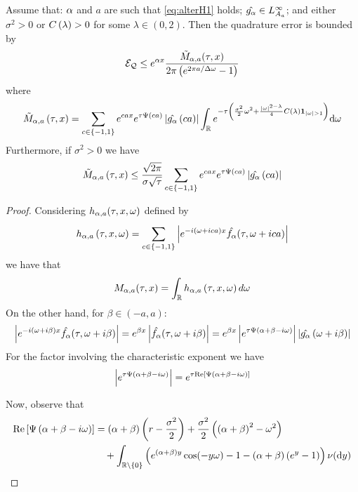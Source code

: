 \documentclass[11pt]{amsart}
\begin{document}
\begin{theorem} \label{teo:boundM}
Assume that: $\alpha$ and $a$ are such that \eqref{eq:alterH1} holds; $\hat{g_{\alpha}} \in L^\infty_{A_{a}}$; and either $\sigma^2>0$ or $C \left( {\lambda} \right)>0$ for some $\lambda\in (0,2)$.
Then the quadrature error is bounded by
\begin{equation*}
\mathcal{E_Q} \leq e^{\alpha x} \frac{\tilde{M}_{\alpha,a}(\tau,x) }{2\pi\left( {e^{2\pi a/\Delta\omega}-1} \right)}
\end{equation*}
where 
\begin{equation}\label{eq:Mbound}
\tilde{M}_{\damp,a} \parent{\tau,x} 
=
\ssum{c\in \sset{-1,1}}{} 
\expfs{cax}
\expfs{\tau \Psi \parent{ca}} \absval{\ft{\ga} \parent{ca}}
\int_{\R}  \expfs{-\tau \left( \frac{\sigma^2}{2}\omega^2 + \frac{|\omega|^{2 - \lambda}}{4} \cl\indicator_{\absval{\omega}>1}\right) } \d \omega
\end{equation}
Furthermore, if $\sigma^2>0$ we have
\begin{equation}
\label{eq:Mboundsigpositive}
\tilde{M}_{\alpha,a} \left( {\tau,x} \right)  \leq \frac{\sqrt{2\pi}}{\sigma\sqrt{\tau}}\displaystyle\sum\limits_{c\in \left\lbrace {-1,1} \right\rbrace}^{} 
e^{cax}
e^{\tau \Psi \left( {ca} \right)} \left| {\hat{g_{\alpha}} \left( {ca} \right)} \right|
\end{equation}

\begin{proof}
Considering $h_{\alpha,a}(\tau,x,\omega)$ defined by
\begin{equation}
h_{\alpha,a} \left( {\tau,x,\omega} \right) = \displaystyle\sum\limits_{c \in \left\lbrace {-1,1} \right\rbrace}^{} \left| {e^{-i\left( {\omega + ica} \right) x}\hat{f_{\alpha}}(\tau,\omega+i ca)} \right| 
\end{equation}
we have that
$$M_{\alpha,a}(\tau,x) = \int_{\mathbb{R}}h_{\alpha,a} \left( {\tau,x,\omega} \right) d\omega$$
On the other hand, for  $\beta\in (-a,a)$:
\begin{equation}
\left| {e^{-i\left( {\omega + i\beta} \right) x}\hat{f_{\alpha}}(\tau,\omega+i \beta)} \right| = e^{\beta x} \left| {\hat{f_{\alpha}}(\tau,\omega+i \beta)} \right|=e^{\beta x}\left| {e^{\tau \Psi \left( {{\alpha+\beta-i\omega}} \right)}} \right|\left| { \hat{g_{\alpha}}\left( {\omega+i\beta} \right)} \right|
\end{equation}
For the factor involving the characteristic exponent we have
\begin{equation}
\left| {e^{\tau \Psi \left( {{\alpha+\beta-i\omega}} \right)}} \right|=e^{\tau \mathrm{Re}\left[\Psi \left( {{\alpha+\beta-i\omega}} \right)\right]}
\end{equation}

Now, observe that
\begin{align}
\notag \mathrm{Re}\left[\Psi \left( {{ \alpha +\beta - i \omega}} \right)\right]&= \left( {\alpha + \beta} \right) \left( {r-\frac{\sigma^2}{2}} \right)+\frac{\sigma^2}{2}\left( {\left( {\alpha +\beta} \right)^2 - \omega^2} \right) \\
\label{eq:boundingPsiPureJump} &\quad +\int_{\mathbb{R} \setminus \left\lbrace {0} \right\rbrace}\left( { e^{\left( {\alpha + \beta} \right) y} \cos(-y\omega)-1-\left( {\alpha + \beta} \right) \left( {e^{y}-1} \right)} \right) \nu(\textrm{d} y)
\end{align}


\end{proof}
\end{theorem}
\end{document}
